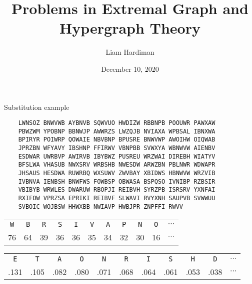 \documentclass[8pt]{beamer}
\title{Problems in Extremal Graph and Hypergraph Theory}
\author{Liam Hardiman}
\date{December 10, 2020}
\theoremstyle{plain}
\begin{document}
\begin{frame}[fragile]{Substitution example}
\begin{center}
\begin{BVerbatim}
    LWNSOZ BNWVWB AYBNVB SQWVUO HWDIZW RBBNPB POOUWR PAWXAW
    PBWZWM YPOBNP BBNWJP AWWRZS LWZQJB NVIAXA WPBSAL IBNXWA
    BPIRYR POIWRP QOWAIE NBVBNP BPUSRE BNWVWP AWOIHW OIQWAB
    JPRZBN WFYAVY IBSHNP FFIRWV VBNPBB SVWXYA WBNWVW AIENBV
    ESDWAR UWRBVP AWIRVB IBYBWZ PUSREU WRZWAI DIREBH WIATYV
    BFSLWA VHASUB NWXSRV WRBSHB NWESDW ARWZBN PBLNWR WDWAPR
    JHSAUS HESDWA RUWRBQ WXSUWV ZWVBAY XBIDWS HBNWVW WRZVIB
    IVBNVA IENBSH BNWFWS FOWBSP OBWASA BSPQSO IVNIBP RZBSIR
    VBIBYB WRWLES DWARUW RBOPJI REIBVH SYRZPB ISRSRV YXNFAI
    RXIFOW VPRZSA EPRIKI REIBVF SLWAVI RVYXNH SAUPVB SVWWUU
    SVBOIC WOJBSW HHWXBB NWIAVP HWBJPR ZNPFFI RWVV
\end{BVerbatim}
\end{center}
    \pause
    \begin{center}
    \begin{tabular}{c c c c c c c c c c c}
        \texttt{W} & \texttt{B} & \texttt{R} & \texttt{S} & \texttt{I} & \texttt{V} & \texttt{A} & \texttt{P} & \texttt{N} & \texttt{O} & $\cdots$\\
        76 & 64 & 39 & 36 & 36 & 35 & 34 & 32 & 30 & 16 & $\cdots$
    \end{tabular}
    \end{center}
    \pause
    \begin{center}
    \begin{tabular}{c c c c c c c c c c c}
    \texttt{E} & \texttt{T} & \texttt{A} & \texttt{O} & \texttt{N} & \texttt{R} & \texttt{I} & \texttt{S} & \texttt{H} & \texttt{D} & $\cdots$\\
    .131 & .105 & .082 & .080 & .071 & .068 & .064 & .061 & .053 & .038 & $\cdots$
    \end{tabular}
    \end{center}
\end{frame}
\end{document}
